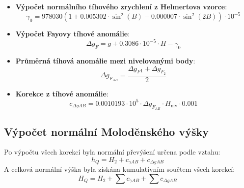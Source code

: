 \begin{itemize}
    \item \textbf{Výpočet normálního tíhového zrychlení z Helmertova vzorce}: 
    \[
    \gamma_0 = 978030 \left(1 + 0.005302 \cdot \sin^2(B) - 0.000007 \cdot \sin^2(2B) \right) \cdot 10^{-5}
    \]
    \item \textbf{Výpočet Fayovy tíhové anomálie}:
    \[
    \Delta g_F = g + 0.3086 \cdot 10^{-5} \cdot H - \gamma_0
    \]
    \item \textbf{Průměrná tíhová anomálie mezi nivelovanými body}:
    \[
    \Delta g_{F_{AB}} = \frac{\Delta g_F{_{1}} + \Delta g_{F_{2}}}{2}
    \]
    \item \textbf{Korekce z tíhové anomálie}:
    \[
    c_{\Delta g AB} = 0.0010193 \cdot 10^5 \cdot \Delta g_{F_{AB}} \cdot H_{\text{niv}} \cdot 0.001
    \]
\end{itemize}

\subsection*{Výpočet normální Moloděnského výšky}
Po výpočtu všech korekcí byla normální převýšení určena podle vztahu:
\[
h_Q = H_{2} + c_{\gamma AB} + c_{\Delta g AB}
\]
A celková normální výška byla získána kumulativním součtem všech korekcí:
\[
H_Q = H_{2} + \sum c_{\gamma AB} + \sum c_{\Delta g AB}
\]
